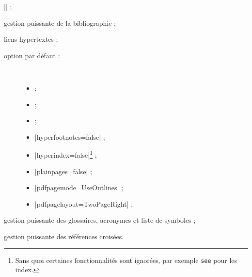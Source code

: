 \begin{description}
\begin{description}
      |\SetCiteCommand{\autocite}| ;
  \end{description}
\item[\package{biblatex} :] gestion puissante de la bibliographie ;
\item[\package{hyperref} :] %
  liens hypertextes ;
  \begin{description}
  \item[option par défaut :]\
    \begin{itemize}
    \item {} ;
    \item {} ;
    \item {} ;
    \item |hyperfootnotes=false| ;
    \item |hyperindex=false|\footnote{Sans quoi certaines fonctionnalités sont
        ignorées, par exemple \protect\lstinline+see+ pour les index.} ;
    \item |plainpages=false| ;
    \item |pdfpagemode=UseOutlines| ;
    \item |pdfpagelayout=TwoPageRight| ;
    \end{itemize}
  \end{description}
\item[\package{glossaries} :] gestion puissante des glossaires,
  acronymes et liste de symboles ;
\item[\package{cleveref} :] gestion puissante des références croisées.
\end{description}

%
\iffalse
\fi
